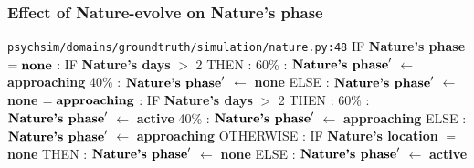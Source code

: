 \documentclass{article}%
\begin{document}
\subsubsection{Effect of Nature{-}evolve on Nature's phase}%
\label{ssubsec:Effect of Nature{-}evolve on Nature's phase}%
\begin{flushleft}%
\verb|psychsim/domains/groundtruth/simulation/nature.py:48|%
\linebreak%
IF %
\textbf{Nature's phase}%
\linebreak%
\hspace*{2em}%
$= \mbox{\textbf{none}}$%
: %
IF %
\textbf{Nature's days}%
$>$%
2%
\linebreak%
\hspace*{4em}%
THEN %
: %
\linebreak%
\hspace*{6em}%
60\%%
: %
$\mbox{\textbf{Nature's phase}} '$%
$\leftarrow$%
\textbf{approaching}%
\linebreak%
\hspace*{6em}%
40\%%
: %
$\mbox{\textbf{Nature's phase}} '$%
$\leftarrow$%
\textbf{none}%
\linebreak%
\hspace*{4em}%
ELSE %
: %
$\mbox{\textbf{Nature's phase}} '$%
$\leftarrow$%
\textbf{none}%
\linebreak%
\hspace*{2em}%
$= \mbox{\textbf{approaching}}$%
: %
IF %
\textbf{Nature's days}%
$>$%
2%
\linebreak%
\hspace*{4em}%
THEN %
: %
\linebreak%
\hspace*{6em}%
60\%%
: %
$\mbox{\textbf{Nature's phase}} '$%
$\leftarrow$%
\textbf{active}%
\linebreak%
\hspace*{6em}%
40\%%
: %
$\mbox{\textbf{Nature's phase}} '$%
$\leftarrow$%
\textbf{approaching}%
\linebreak%
\hspace*{4em}%
ELSE %
: %
$\mbox{\textbf{Nature's phase}} '$%
$\leftarrow$%
\textbf{approaching}%
\linebreak%
\hspace*{2em}%
OTHERWISE %
: %
IF %
\textbf{Nature's location}%
$=$%
\textbf{none}%
\linebreak%
\hspace*{4em}%
THEN %
: %
$\mbox{\textbf{Nature's phase}} '$%
$\leftarrow$%
\textbf{none}%
\linebreak%
\hspace*{4em}%
ELSE %
: %
$\mbox{\textbf{Nature's phase}} '$%
$\leftarrow$%
\textbf{active}%
\end{flushleft}
\end{document}
